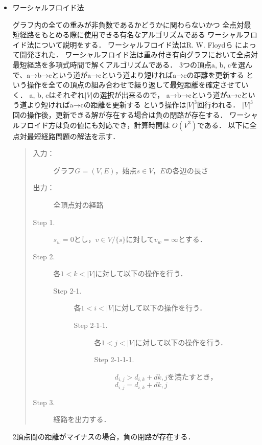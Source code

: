 \documentclass[12pt]{optlab-bachelor}
\begin{document}
\begin{itemize}
  \item ワーシャルフロイド法

  グラフ内の全ての重みが非負数であるかどうかに関わらないかつ
  全点対最短経路をもとめる際に使用できる有名なアルゴリズムである
  ワーシャルフロイド法について説明をする．
  ワーシャルフロイド法はR. W. Floydら \cite{Floyd}によって開発された．
  ワーシャルフロイド法は重み付き有向グラフにおいて全点対最短経路を多項式時間で解くアルゴリズムである．
  3つの頂点a, b, cを選んで、a→b→cという道がa→cという道より短ければa→cの距離を更新する
  という操作を全ての頂点の組み合わせで繰り返して最短距離を確定させていく．
  a, b, cはそれぞれ$|V|$の選択が出来るので，
  a→b→cという道がa→cという道より短ければa→cの距離を更新する
  という操作は$|V|^3$回行われる．
  $|V|^3$回の操作後，更新できる解が存在する場合は負の閉路が存在する．
  ワーシャルフロイド方は負の値にも対応でき，計算時間は $O(V^3)$である．
  以下に全点対最短経路問題の解法を示す．

  \begin{quote}
    \begin{description}
      \item[入力：] グラフ$G=(V,E)$，始点$s \in V$，$E$の各辺の長さ
      \item[出力：] 全頂点対の経路
      \item[Step 1.] $s_w = 0$とし，$v \in V/\{s\}$に対して$v_w = \infty$とする．
      \item[Step 2.] 各$1<k<|V|$に対して以下の操作を行う．
      \begin{description}
        \item[Step 2-1.] 各$1<i<|V|$に対して以下の操作を行う．
        \begin{description}
          \item[Step 2-1-1.] 各$1<j<|V|$に対して以下の操作を行う．
          \begin{description}
            \item[Step 2-1-1-1.] $d_{i,j} > d_{i,k} + d{k,j}$を満たすとき，
            $d_{i,j} = d_{i,k} + d{k,j}$
          \end{description}
        \end{description}
      \end{description}

      \item[Step 3.] 経路を出力する．
    \end{description}
  \end{quote}
  2頂点間の距離がマイナスの場合，負の閉路が存在する．
\end{itemize}
\end{document}
